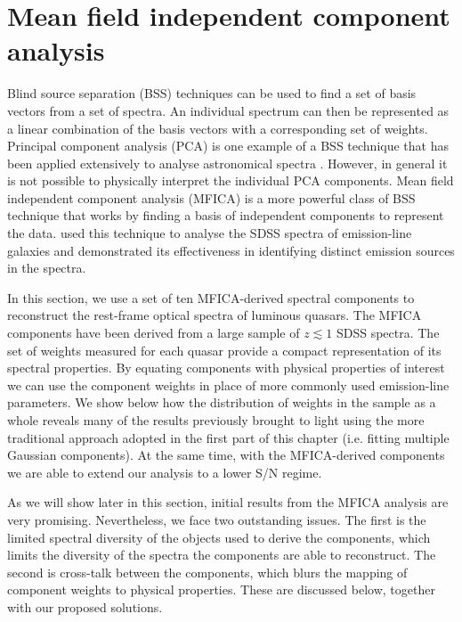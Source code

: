 \section{Mean field independent component analysis}

Blind source separation (BSS) techniques can be used to find a set of basis vectors from a set of spectra. 
An individual spectrum can then be represented as a linear combination of the basis vectors with a corresponding set of weights.  
Principal component analysis (PCA) is one example of a BSS technique that has been applied extensively to analyse astronomical spectra \citep[e.g.][]{mittaz90,francis92,yip04}. 
However, in general it is not possible to physically interpret the individual PCA components. 
Mean field independent component analysis (MFICA) is a more powerful class of BSS technique that works by finding a basis of independent components to represent the data.  
\citet{allen13} used this technique to analyse the SDSS spectra of emission-line galaxies and demonstrated its effectiveness in identifying distinct emission sources in the spectra. 

In this section, we use a set of ten MFICA-derived spectral components to reconstruct the rest-frame optical spectra of luminous quasars.
The MFICA components have been derived from a large sample of $z \lesssim 1$ SDSS spectra.  
The set of weights measured for each quasar provide a compact representation of its spectral properties.  
By equating components with physical properties of interest we can use the component weights in place of more commonly used emission-line parameters. 
We show below how the distribution of weights in the sample as a whole reveals many of the results previously brought to light using the more traditional approach adopted in the first part of this chapter (i.e. fitting multiple Gaussian components). 
At the same time, with the MFICA-derived components we are able to extend our analysis to a lower S/N regime.

As we will show later in this section, initial results from the MFICA analysis are very promising.
Nevertheless, we face two outstanding issues.  
The first is the limited spectral diversity of the objects used to derive the components, which limits the diversity of the spectra the components are able to reconstruct. 
The second is cross-talk between the components, which blurs the mapping of component weights to physical properties. 
These are discussed below, together with our proposed solutions. 


